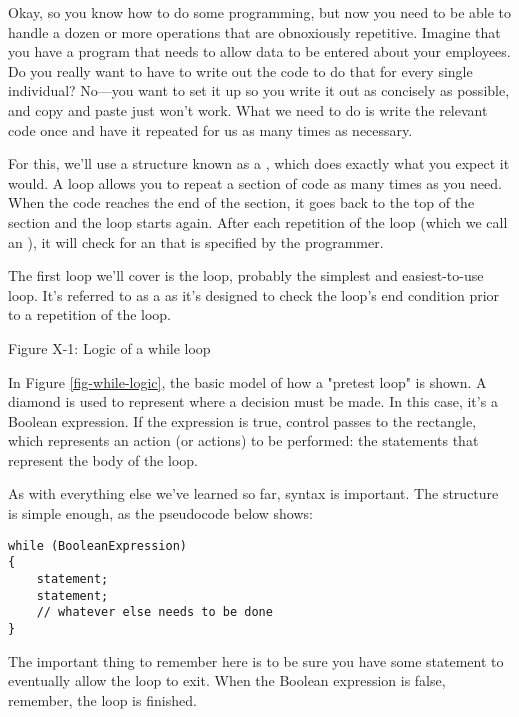 
Okay, so you know how to do some programming, but now you need to be able to handle a dozen or more operations that are obnoxiously repetitive.
Imagine that you have a program that needs to allow data to be entered about your employees.
Do you really want to have to write out the code to do that for every single individual?
No---you want to set it up so you write it out as concisely as possible, and copy and paste just won't work.
What we need to do is write the relevant code once and have it repeated for us as many times as necessary.

For this, we'll use a structure known as a , which does exactly what you expect it would.
A loop allows you to repeat a section of code as many times as you need.
When the code reaches the end of the section, it goes back to the top of the section and the loop starts again.
After each repetition of the loop (which we call an ), it will check for an  that is specified by the programmer. 


The first loop we'll cover is the  loop, probably the simplest and easiest-to-use loop.
It's referred to as a  as it's designed to check the loop's end condition prior to a repetition of the loop.

Figure X-1: Logic of a while loop
\label{fig-while-logic}

In Figure \ref{fig-while-logic}, the basic model of how a "pretest loop" is shown.
A diamond is used to represent where a decision must be made.
In this case, it's a Boolean expression.
If the expression is true, control passes to the rectangle, which represents an action (or actions) to be performed: the statements that represent the body of the loop.

As with everything else we've learned so far, syntax is important. The structure is simple enough, as the pseudocode below shows:

\begin{lstlisting}
while (BooleanExpression)
{
	statement;
	statement;
	// whatever else needs to be done
}
\end{lstlisting}

The important thing to remember here is to be sure you have some statement to eventually allow the loop to exit.
When the Boolean expression is false, remember, the loop is finished.


